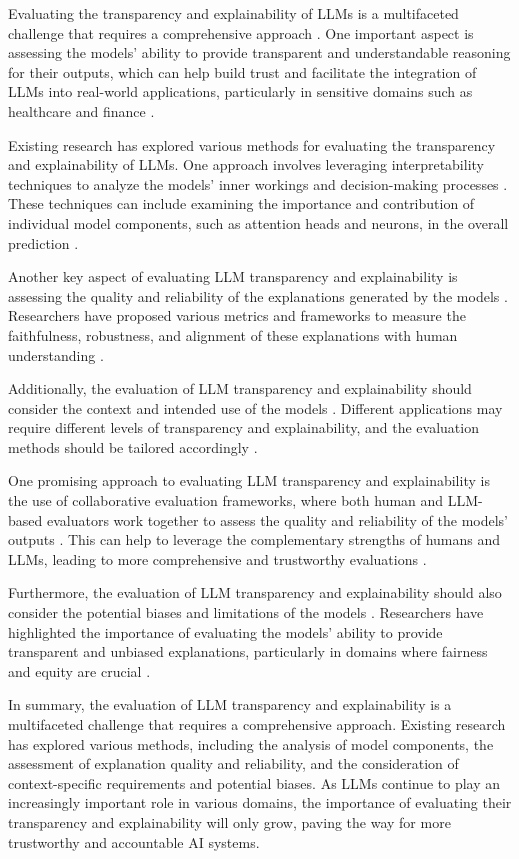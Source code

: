 \documentclass[11pt]{article}
\begin{document}
Evaluating the transparency and explainability of LLMs is a multifaceted challenge that requires a comprehensive approach \cite{ref180}. One important aspect is assessing the models' ability to provide transparent and understandable reasoning for their outputs, which can help build trust and facilitate the integration of LLMs into real-world applications, particularly in sensitive domains such as healthcare and finance \cite{ref181}.

Existing research has explored various methods for evaluating the transparency and explainability of LLMs. One approach involves leveraging interpretability techniques to analyze the models' inner workings and decision-making processes \cite{ref182,ref183}. These techniques can include examining the importance and contribution of individual model components, such as attention heads and neurons, in the overall prediction \cite{ref184,ref185}.

Another key aspect of evaluating LLM transparency and explainability is assessing the quality and reliability of the explanations generated by the models \cite{ref186}. Researchers have proposed various metrics and frameworks to measure the faithfulness, robustness, and alignment of these explanations with human understanding \cite{ref187,ref188}.

Additionally, the evaluation of LLM transparency and explainability should consider the context and intended use of the models \cite{ref189}. Different applications may require different levels of transparency and explainability, and the evaluation methods should be tailored accordingly \cite{ref190}.

One promising approach to evaluating LLM transparency and explainability is the use of collaborative evaluation frameworks, where both human and LLM-based evaluators work together to assess the quality and reliability of the models' outputs \cite{ref66}. This can help to leverage the complementary strengths of humans and LLMs, leading to more comprehensive and trustworthy evaluations \cite{ref191}.

Furthermore, the evaluation of LLM transparency and explainability should also consider the potential biases and limitations of the models \cite{ref192}. Researchers have highlighted the importance of evaluating the models' ability to provide transparent and unbiased explanations, particularly in domains where fairness and equity are crucial \cite{ref193}.

In summary, the evaluation of LLM transparency and explainability is a multifaceted challenge that requires a comprehensive approach. Existing research has explored various methods, including the analysis of model components, the assessment of explanation quality and reliability, and the consideration of context-specific requirements and potential biases. As LLMs continue to play an increasingly important role in various domains, the importance of evaluating their transparency and explainability will only grow, paving the way for more trustworthy and accountable AI systems.
\end{document}
